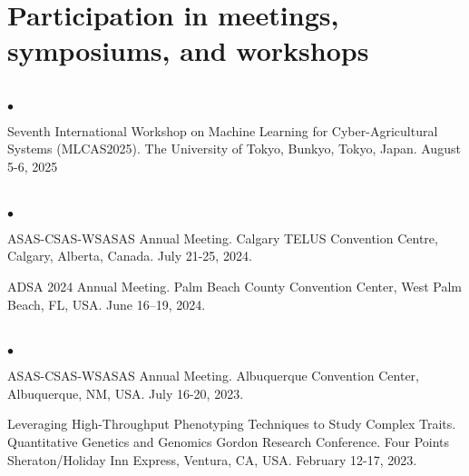 \documentclass[margin,line,10pt]{res}
\newenvironment{list2}{
  \begin{list}{$\bullet$}{%
      \setlength{\itemsep}{0in}
      \setlength{\parsep}{0in} \setlength{\parskip}{0in}
      \setlength{\topsep}{0in} \setlength{\partopsep}{0in} 
      \setlength{\leftmargin}{0.2in}}}{\end{list}}
\begin{document}
\begin{resume}
\vspace{0.5cm}
\section{\sc Participation in meetings, symposiums, and workshops} 
\vspace{2cm}


\section{}
\begin{list2}

  \item Seventh International Workshop on Machine Learning for Cyber-Agricultural Systems (MLCAS2025). The University of Tokyo, Bunkyo, Tokyo, Japan. August 5-6, 2025

\end{list2}


\section{}
\begin{list2}

  \item ASAS-CSAS-WSASAS Annual Meeting. Calgary TELUS Convention Centre, Calgary, Alberta, Canada. July 21-25, 2024.

  \vspace{0.5cm}

  \item  ADSA 2024 Annual Meeting. Palm Beach County Convention Center, West Palm Beach, FL, USA. June 16–19, 2024. 

\end{list2}


\section{}
\begin{list2}

  \item ASAS-CSAS-WSASAS Annual Meeting. Albuquerque Convention Center, Albuquerque, NM, USA. July 16-20, 2023. 

  \vspace{0.5cm}

  \item Leveraging High-Throughput Phenotyping Techniques to Study Complex Traits. Quantitative Genetics and Genomics Gordon Research Conference. Four Points Sheraton/Holiday Inn Express, Ventura, CA, USA. February 12-17, 2023.


\end{list2}
\end{resume}
\end{document}
